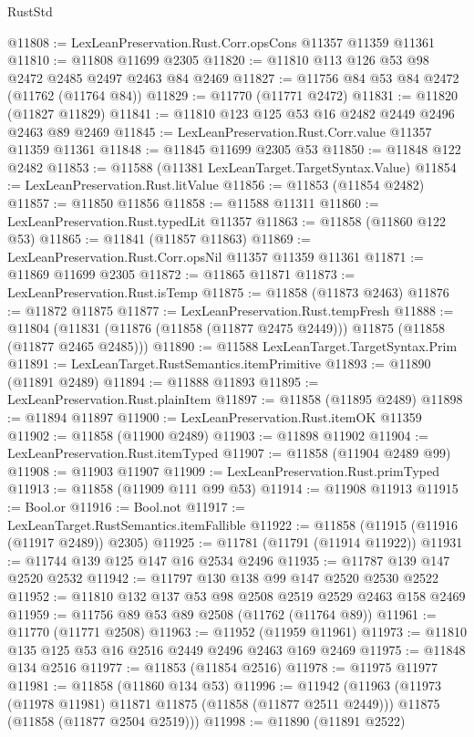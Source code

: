 \begin{lexlean}{RustStd}
\begin{coremodule}
@11808 := LexLeanPreservation.Rust.Corr.opsCons @11357 @11359 @11361
@11810 := @11808 @11699 @2305
@11820 := @11810 @113 @126 @53 @98 @2472 @2485 @2497 @2463 @84 @2469
@11827 := @11756 @84 @53 @84 @2472 (@11762 (@11764 @84))
@11829 := @11770 (@11771 @2472)
@11831 := @11820 (@11827 @11829)
@11841 := @11810 @123 @125 @53 @16 @2482 @2449 @2496 @2463 @89 @2469
@11845 := LexLeanPreservation.Rust.Corr.value @11357 @11359 @11361
@11848 := @11845 @11699 @2305 @53
@11850 := @11848 @122 @2482
@11853 := @11588 (@11381 LexLeanTarget.TargetSyntax.Value)
@11854 := LexLeanPreservation.Rust.litValue
@11856 := @11853 (@11854 @2482)
@11857 := @11850 @11856
@11858 := @11588 @11311
@11860 := LexLeanPreservation.Rust.typedLit @11357
@11863 := @11858 (@11860 @122 @53)
@11865 := @11841 (@11857 @11863)
@11869 := LexLeanPreservation.Rust.Corr.opsNil @11357 @11359 @11361
@11871 := @11869 @11699 @2305
@11872 := @11865 @11871
@11873 := LexLeanPreservation.Rust.isTemp
@11875 := @11858 (@11873 @2463)
@11876 := @11872 @11875
@11877 := LexLeanPreservation.Rust.tempFresh
@11888 := @11804
    (@11831 (@11876 (@11858 (@11877 @2475 @2449))) @11875 (@11858 (@11877 @2465 @2485)))
@11890 := @11588 LexLeanTarget.TargetSyntax.Prim
@11891 := LexLeanTarget.RustSemantics.itemPrimitive
@11893 := @11890 (@11891 @2489)
@11894 := @11888 @11893
@11895 := LexLeanPreservation.Rust.plainItem
@11897 := @11858 (@11895 @2489)
@11898 := @11894 @11897
@11900 := LexLeanPreservation.Rust.itemOK @11359
@11902 := @11858 (@11900 @2489)
@11903 := @11898 @11902
@11904 := LexLeanPreservation.Rust.itemTyped
@11907 := @11858 (@11904 @2489 @99)
@11908 := @11903 @11907
@11909 := LexLeanPreservation.Rust.primTyped
@11913 := @11858 (@11909 @111 @99 @53)
@11914 := @11908 @11913
@11915 := Bool.or
@11916 := Bool.not
@11917 := LexLeanTarget.RustSemantics.itemFallible
@11922 := @11858 (@11915 (@11916 (@11917 @2489)) @2305)
@11925 := @11781 (@11791 (@11914 @11922))
@11931 := @11744 @139 @125 @147 @16 @2534 @2496
@11935 := @11787 @139 @147 @2520 @2532
@11942 := @11797 @130 @138 @99 @147 @2520 @2530 @2522
@11952 := @11810 @132 @137 @53 @98 @2508 @2519 @2529 @2463 @158 @2469
@11959 := @11756 @89 @53 @89 @2508 (@11762 (@11764 @89))
@11961 := @11770 (@11771 @2508)
@11963 := @11952 (@11959 @11961)
@11973 := @11810 @135 @125 @53 @16 @2516 @2449 @2496 @2463 @169 @2469
@11975 := @11848 @134 @2516
@11977 := @11853 (@11854 @2516)
@11978 := @11975 @11977
@11981 := @11858 (@11860 @134 @53)
@11996 := @11942
    (@11963
      (@11973 (@11978 @11981) @11871 @11875 (@11858 (@11877 @2511 @2449)))
      @11875
      (@11858 (@11877 @2504 @2519)))
@11998 := @11890 (@11891 @2522)

\end{coremodule}
\end{lexlean}
